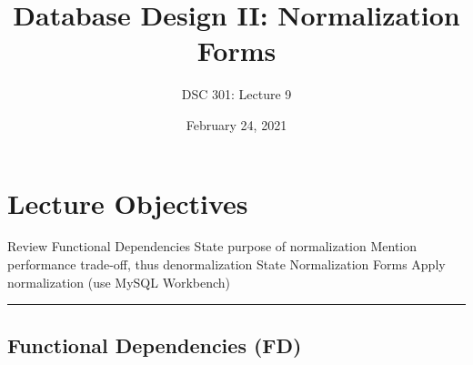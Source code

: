\documentclass{article}
\begin{document}
\title{Database Design II: Normalization Forms
}
\author{DSC 301: Lecture 9}
\date{February 24, 2021} %
\maketitle





\begin{outline}[enumerate]

\end{outline}
\begin{outline}
        
\end{outline}




\section*{Lecture Objectives}
\begin{outline}
        \1  Review Functional Dependencies
        \1  State purpose of normalization
                \2 Mention performance trade-off, thus denormalization 
        \1  State Normalization Forms
        \1  Apply normalization (use MySQL Workbench)
\end{outline}

\hspace{-0.5cm}\rule[-0.101in]{\textwidth}{0.0025in}












\subsection*{Functional Dependencies (FD)}  
 
\end{document}
